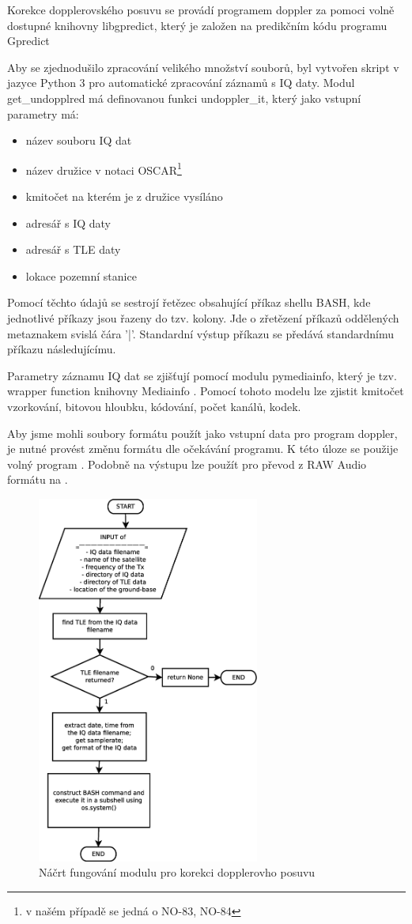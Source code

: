   Korekce dopplerovského posuvu se provádí programem doppler za pomoci volně dostupné knihovny libgpredict, který je založen na predikčním kódu programu Gpredict\cite{github:ligpredict}

  Aby se zjednodušilo zpracování velikého množství souborů, byl vytvořen skript v jazyce Python 3 pro automatické zpracování záznamů s IQ daty. Modul get\_undopplred má definovanou funkci undoppler\_it, který jako vstupní parametry má:
  \begin{itemize}
    \item název souboru IQ dat
    \item název družice v notaci OSCAR\footnote{v našém případě se jedná o NO-83, NO-84}
    \item kmitočet na kterém je z družice vysíláno
    \item adresář s IQ daty
    \item adresář s TLE daty
    \item lokace pozemní stanice
  \end{itemize}

  Pomocí těchto údajů se sestrojí řetězec obsahující příkaz shellu BASH, kde jednotlivé příkazy jsou řazeny do tzv. kolony. Jde o zřetězení příkazů oddělených metaznakem svislá čára '|'. Standardní výstup příkazu se předává standardnímu příkazu následujícímu. \cite{book:Brandejs-unix-linux}

  Parametry záznamu IQ dat se zjišťují pomocí modulu pymediainfo, který je tzv. wrapper function knihovny Mediainfo \cite{github:pymediainfo}. Pomocí tohoto modelu lze zjistit kmitočet vzorkování, bitovou hloubku, kódování, počet kanálů, kodek.

  Aby jsme mohli soubory formátu  použít jako vstupní data pro program doppler, je nutné provést změnu formátu dle očekávání programu. K této úloze se použije volný program . Podobně na výstupu lze použít  pro převod z RAW Audio formátu na .

  \begin{figure}[ht]
    \centering
    \includegraphics[width=0.65\textwidth]{./obrazky/get_undopplered.eps}
    \caption{Náčrt fungování modulu pro korekci dopplerovho posuvu}
    \label{fig:undoppler}
  \end{figure}

